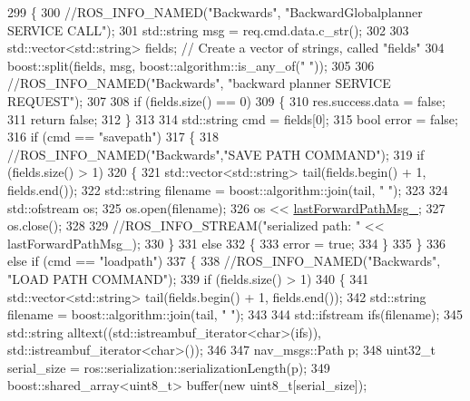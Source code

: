 \begin{DoxyCode}
299 \{
300     \textcolor{comment}{//ROS\_INFO\_NAMED("Backwards", "BackwardGlobalplanner SERVICE CALL");}
301     std::string msg = req.cmd.data.c\_str();
302 
303     std::vector<std::string> fields; \textcolor{comment}{// Create a vector of strings, called "fields"}
304     boost::split(fields, msg, boost::algorithm::is\_any\_of(\textcolor{stringliteral}{" "}));
305 
306     \textcolor{comment}{//ROS\_INFO\_NAMED("Backwards", "backward planner SERVICE REQUEST");}
307 
308     \textcolor{keywordflow}{if} (fields.size() == 0)
309     \{
310         res.success.data = \textcolor{keyword}{false};
311         \textcolor{keywordflow}{return} \textcolor{keyword}{false};
312     \}
313 
314     std::string cmd = fields[0];
315     \textcolor{keywordtype}{bool} error = \textcolor{keyword}{false};
316     \textcolor{keywordflow}{if} (cmd == \textcolor{stringliteral}{"savepath"})
317     \{
318         \textcolor{comment}{//ROS\_INFO\_NAMED("Backwards","SAVE PATH COMMAND");}
319         \textcolor{keywordflow}{if} (fields.size() > 1)
320         \{
321             std::vector<std::string> tail(fields.begin() + 1, fields.end());
322             std::string filename = boost::algorithm::join(tail, \textcolor{stringliteral}{" "});
323 
324             std::ofstream os;
325             os.open(filename);
326             os << \hyperlink{classcl__move__base__z_1_1backward__global__planner_1_1BackwardGlobalPlanner_a149ee7d22d98271c9ee1da55241d500b}{lastForwardPathMsg\_};
327             os.close();
328 
329             \textcolor{comment}{//ROS\_INFO\_STREAM("serialized path: " << lastForwardPathMsg\_);}
330         \}
331         \textcolor{keywordflow}{else}
332         \{
333             error = \textcolor{keyword}{true};
334         \}
335     \}
336     \textcolor{keywordflow}{else} \textcolor{keywordflow}{if} (cmd == \textcolor{stringliteral}{"loadpath"})
337     \{
338         \textcolor{comment}{//ROS\_INFO\_NAMED("Backwards", "LOAD PATH COMMAND");}
339         \textcolor{keywordflow}{if} (fields.size() > 1)
340         \{
341             std::vector<std::string> tail(fields.begin() + 1, fields.end());
342             std::string filename = boost::algorithm::join(tail, \textcolor{stringliteral}{" "});
343 
344             std::ifstream ifs(filename);
345             std::string alltext((std::istreambuf\_iterator<char>(ifs)), std::istreambuf\_iterator<char>());
346 
347             nav\_msgs::Path p;
348             uint32\_t serial\_size = ros::serialization::serializationLength(p);
349             boost::shared\_array<uint8\_t> buffer(\textcolor{keyword}{new} uint8\_t[serial\_size]);

\end{DoxyCode}
